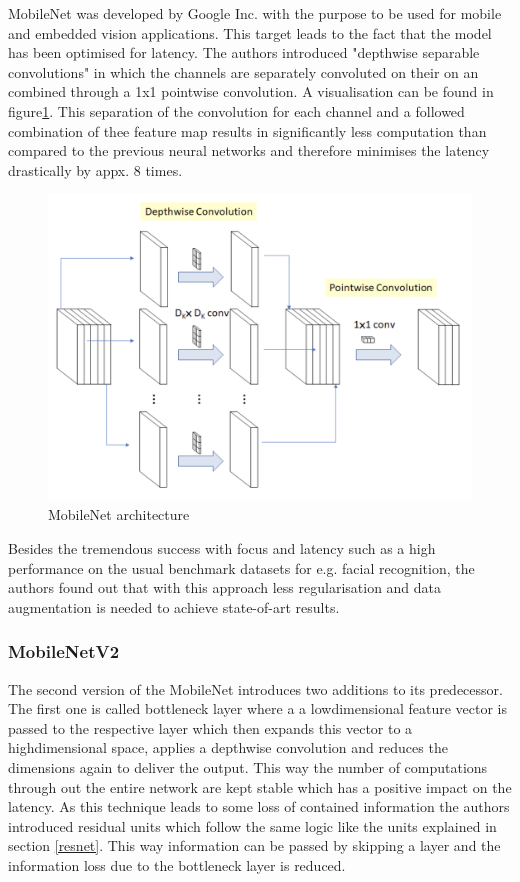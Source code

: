 MobileNet was developed by Google Inc. with the purpose to be used for mobile and embedded vision applications. This target leads to the fact that the model has been optimised for latency.
The authors introduced "depthwise separable convolutions" in which the channels are separately convoluted on their on an combined through a 1x1 pointwise convolution\cite{howard2017mobilenets}. A visualisation can be found in figure\ref{fig:mobilenet}. This separation of the convolution for each channel and a followed combination of thee feature map results in significantly less computation than compared to the previous neural networks and therefore minimises the latency drastically by appx. 8 times\cite{howard2017mobilenets}.

\begin{figure}
  \centering
  \includegraphics[width=\linewidth]{figures/mobilenet.png}
  \caption{MobileNet architecture}
  \label{fig:mobilenet}
\end{figure}

Besides the tremendous success with focus and latency such as a high performance on the usual benchmark datasets for e.g. facial recognition, the authors found out that with this approach less regularisation and data augmentation is needed to achieve state-of-art results.

\subsubsection{MobileNetV2}
The second version of the MobileNet introduces two additions to its predecessor. The first one is called bottleneck layer where a a lowdimensional feature vector is passed to the respective layer which then expands this vector to a highdimensional space, applies a depthwise convolution and reduces the dimensions again to deliver the output\cite{sandler2019mobilenetv2}. This way the number of computations through out the entire network are kept stable which has a positive impact on the latency. As this technique leads to some loss of contained information the authors introduced residual units which follow the same logic like the units explained in section \ref{resnet}. This way information can be passed by skipping a layer and the information loss due to the bottleneck layer is reduced.

